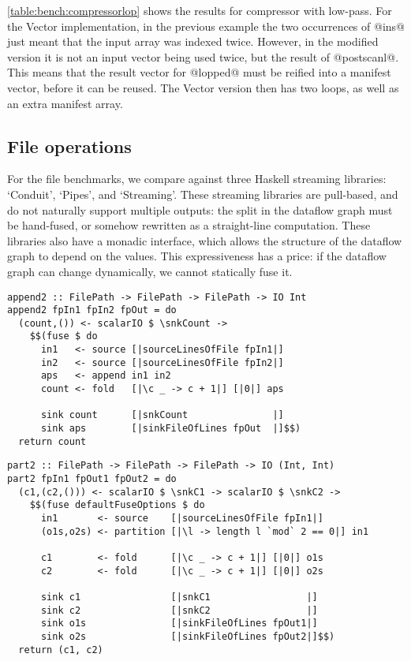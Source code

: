\autoref{table:bench:compressorlop} shows the results for compressor with low-pass.
For the Vector implementation, in the previous example the two occurrences of @ins@ just meant that the input array was indexed twice.
However, in the modified version it is not an input vector being used twice, but the result of @postscanl@.
This means that the result vector for @lopped@ must be reified into a manifest vector, before it can be reused.
The Vector version then has two loops, as well as an extra manifest array.





\subsection{File operations}
For the file benchmarks, we compare against three Haskell streaming libraries: `Conduit', `Pipes', and `Streaming'.
These streaming libraries are pull-based, and do not naturally support multiple outputs: the split in the dataflow graph must be hand-fused, or somehow rewritten as a straight-line computation.
These libraries also have a monadic interface, which allows the structure of the dataflow graph to depend on the values. This expressiveness has a price: if the dataflow graph can change dynamically, we cannot statically fuse it.

\begin{lstlisting}[float,label=l:bench:append2Folderol,caption=Folderol implementation of append2]
append2 :: FilePath -> FilePath -> FilePath -> IO Int
append2 fpIn1 fpIn2 fpOut = do
  (count,()) <- scalarIO $ \snkCount ->
    $$(fuse $ do
      in1   <- source [|sourceLinesOfFile fpIn1|]
      in2   <- source [|sourceLinesOfFile fpIn2|]
      aps   <- append in1 in2
      count <- fold   [|\c _ -> c + 1|] [|0|] aps

      sink count      [|snkCount               |]
      sink aps        [|sinkFileOfLines fpOut  |]$$)
  return count
\end{lstlisting}

\begin{lstlisting}[float,label=l:bench:part2Folderol,caption=Folderol implementation of part2]
part2 :: FilePath -> FilePath -> FilePath -> IO (Int, Int)
part2 fpIn1 fpOut1 fpOut2 = do
  (c1,(c2,())) <- scalarIO $ \snkC1 -> scalarIO $ \snkC2 ->
    $$(fuse defaultFuseOptions $ do
      in1       <- source    [|sourceLinesOfFile fpIn1|]
      (o1s,o2s) <- partition [|\l -> length l `mod` 2 == 0|] in1

      c1        <- fold      [|\c _ -> c + 1|] [|0|] o1s
      c2        <- fold      [|\c _ -> c + 1|] [|0|] o2s

      sink c1                [|snkC1                 |]
      sink c2                [|snkC2                 |]
      sink o1s               [|sinkFileOfLines fpOut1|]
      sink o2s               [|sinkFileOfLines fpOut2|]$$)
  return (c1, c2)
\end{lstlisting}

